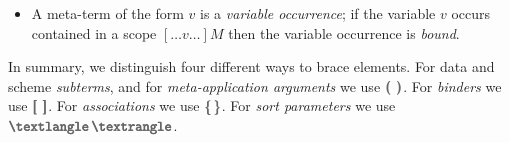 \documentclass[letterpaper,11pt]{article}
\newcommand{\CK}[1]{\textcolor{blue}{CK: #1}}
\newcommand{\KR}[1]{\textcolor{red}{KR: #1}}
\newcommand{\MS}[1]{\textcolor{violet}{MS: #1}}
\begin{document}
\begin{itemize}

\item A meta-term of the form $v$ is a \emph{variable occurrence}; if the variable $v$ occurs contained
  in a scope $[…v…]M$ then the variable occurrence is \emph{bound}.

\end{itemize}


In summary, we distinguish four different ways to brace elements. For data and scheme
\emph{subterms}, and for \emph{meta-application arguments} we use $\kw{( )}$.  For \emph{binders} we
use $\kw{[ ]}$.  For \emph{associations} we use $\kwm{\{\,\}}$.  For \emph{sort parameters} we use
$\kwm{⟨\,⟩}$.
\end{document}
